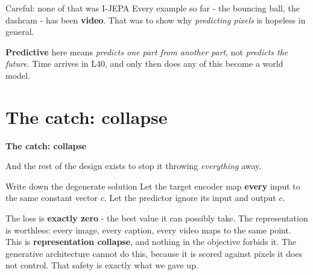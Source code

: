 \documentclass[aspectratio=169]{beamer}
\begin{document}
\begin{frame}{Careful: none of that was I-JEPA}
  \small
  Every example so far - the bouncing ball, the dashcam - has been \textbf{video}. That
  was to show why \emph{predicting pixels} is hopeless in general.
  \vskip 10pt
  \begin{center}
  \end{center}
  \vskip 10pt
  \textbf{Predictive} here means \emph{predicts one part from another part}, not
  \emph{predicts the future}. Time arrives in L40, and only then does any of this become
  a world model.
\end{frame}

\section{The catch: collapse}

\begin{frame}[plain]
  \vfill
  \begin{center}
    {\Large\color{popblue}\textbf{The catch: collapse}}\\[0.9em]
    \begin{minipage}{0.82\textwidth}\centering\small
      And the rest of the design exists to stop it throwing \emph{everything} away.
    \end{minipage}
  \end{center}
  \vfill
\end{frame}

\begin{frame}{Write down the degenerate solution}
  \small
  Let the target encoder map \textbf{every} input to the same constant vector $c$. Let the
  predictor ignore its input and output $c$.
  \vskip 8pt
  \begin{center}
  \end{center}
  \vskip 8pt
  The loss is \textbf{exactly zero} - the best value it can possibly take. The
  representation is worthless: every image, every caption, every video maps to the same
  point.
  \vskip 8pt
  This is \textbf{representation collapse}, and nothing in the objective forbids it.
  \vskip 4pt
  \footnotesize\color{gray}The generative architecture cannot do this, because it is
  scored against pixels it does not control. That safety is exactly what we gave up.
\end{frame}
\end{document}
